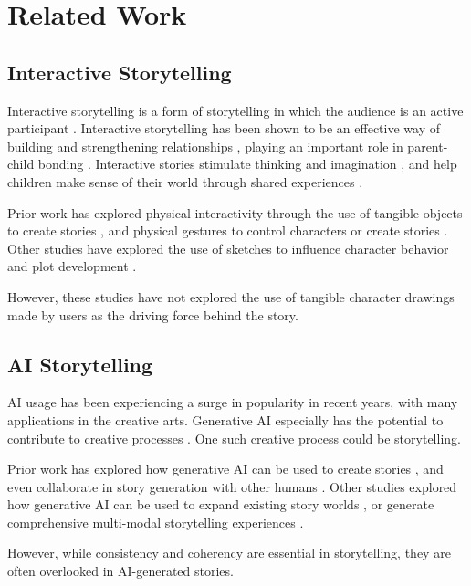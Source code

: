 \documentclass[submit,techrep,english]{ipsj}
\begin{document}
\section{Related Work}
\label{sec:related-work}

\subsection{Interactive Storytelling}
Interactive storytelling is a form of storytelling in which the audience is an active participant \cite{14:WangRCRMB22}. Interactive storytelling has been shown to be an effective way of building and strengthening relationships \cite{15:SchlauchSG22}, playing an important role in parent-child bonding \cite{12:ZhangXWYRWYWL22}. Interactive stories stimulate thinking and imagination \cite{11:LimaGV20}, and help children make sense of their world through shared experiences \cite{9:RyokaiC99}.

Prior work has explored physical interactivity through the use of tangible objects to create stories \cite{9:RyokaiC99}, and physical gestures to control characters \cite{2:LiuLWCS12} or create stories \cite{3:ZhaoB23}. Other studies have explored the use of sketches to influence character behavior and plot development \cite{11:LimaGV20}.

However, these studies have not explored the use of tangible character drawings made by users as the driving force behind the story.

\subsection{AI Storytelling}
AI usage has been experiencing a surge in popularity in recent years, with many applications in the creative arts. Generative AI especially has the potential to contribute to creative processes \cite{6:TholanderJ23}. One such creative process could be storytelling.

Prior work has explored how generative AI can be used to create stories \cite{13:abs-2011-04242}, and even collaborate in story generation with other humans \cite{8:ShakeriND21}. Other studies explored how generative AI can be used to expand existing story worlds \cite{10:ChopraVSS21}, or generate comprehensive multi-modal storytelling experiences \cite{4:HanC23}.

However, while consistency and coherency are essential in storytelling, they are often overlooked in AI-generated stories.
\end{document}
